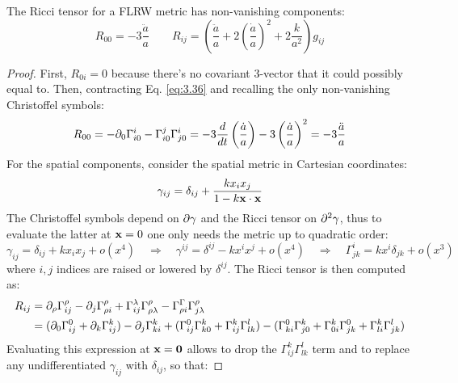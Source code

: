 \begin{proposition}
  The Ricci tensor for a FLRW metric has non-vanishing components:
  \begin{equation}
    R_{00} = - 3 \frac{\ddot{a}}{a}
    \qquad
    R_{ij} = \left( \frac{\ddot{a}}{a} + 2 \left( \frac{\dot{a}}{a} \right)^2 + 2 \frac{k}{a^2} \right) g_{ij}
    \label{eq:4.58}
  \end{equation}
\end{proposition}
\begin{proof}
  First, $ R_{0i} = 0 $ because there's no covariant 3-vector that it could possibly equal to. Then, contracting Eq. \ref{eq:3.36} and recalling the only non-vanishing Christoffel symbols:
  \begin{equation*}
    R_{00} = - \partial_0 \Gamma^i_{i0} - \Gamma^j_{i0} \Gamma^i_{j0} = - 3 \frac{d}{dt} \left( \frac{\dot{a}}{a} \right) - 3 \left( \frac{\dot{a}}{a} \right)^2 = - 3 \frac{\ddot{a}}{a}
  \end{equation*}
  For the spatial components, consider the spatial metric in Cartesian coordinates:
  \begin{equation*}
    \gamma_{ij} = \delta_{ij} + \frac{k x_i x_j}{1 - k \mathbf{x} \cdot \mathbf{x}}
  \end{equation*}
  The Christoffel symbols depend on $ \partial \gamma $ and the Ricci tensor on $ \partial^2 \gamma $, thus to evaluate the latter at $ \mathbf{x} = 0 $ one only needs the metric up to quadratic order:
  \begin{equation*}
    \gamma_{ij} = \delta_{ij} + k x_i x_j + o(x^4)
    \quad \Rightarrow \quad
    \gamma^{ij} = \delta^{ij} - k x^i x^j + o(x^4)
    \quad \Rightarrow \quad
    \Gamma^i_{jk} = k x^i \delta_{jk} + o(x^3)
  \end{equation*}
  where $ i,j $ indices are raised or lowered by $ \delta^{ij} $. The Ricci tensor is then computed as:
  \begin{equation*}
    \begin{split}
      R_{ij}
      &= \partial_\rho \Gamma^\rho_{ij} - \partial_j \Gamma^\rho_{\rho i} + \Gamma^\lambda_{ij} \Gamma^\rho_{\rho \lambda} - \Gamma^\Gamma_{\rho i} \Gamma^\rho_{j \lambda} \\
      &= (\partial_0 \Gamma^0_{ij} + \partial_k \Gamma^k_{ij}) - \partial_j \Gamma^k_{ki} + (\Gamma^0_{ij} \Gamma^k_{k0} + \Gamma^k_{ij} \Gamma^l_{lk}) - (\Gamma^0_{ki} \Gamma^k_{j0} + \Gamma^k_{0i} \Gamma^0_{jk} + \Gamma^k_{li} \Gamma^l_{jk})
    \end{split}
  \end{equation*}
  Evaluating this expression at $ \mathbf{x} = \mathbf{0} $ allows to drop the $ \Gamma^k_{ij} \Gamma^l_{lk} $ term and to replace any undifferentiated $ \gamma_{ij} $ with $ \delta_{ij} $, so that:

\end{proof}
